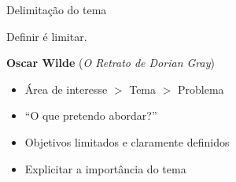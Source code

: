 \documentclass{beamer}
\begin{document}
\begin{frame}{Delimitação do tema}
  \begin{block}{}
    Definir é limitar.

    \bigskip
    \scriptsize
    \hfill {\bf Oscar Wilde} ({\em O Retrato de Dorian Gray})
  \end{block}
  \bigskip
  \begin{itemize}
    \footnotesize
  \item Área de interesse $>$ Tema $>$ Problema
  \item ``O que pretendo abordar?''
  \item Objetivos limitados e claramente definidos
  \item Explicitar a importância do tema
  \end{itemize}
\end{frame}





\end{document}
